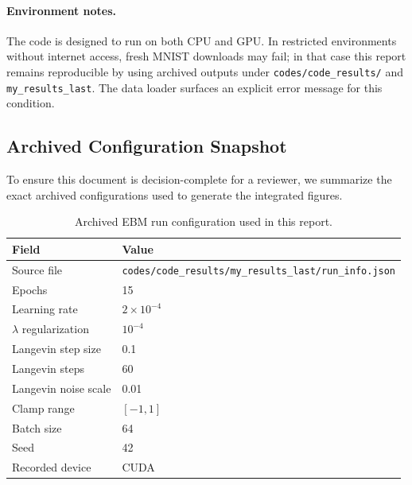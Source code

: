 \paragraph{Environment notes.}
The code is designed to run on both CPU and GPU. In restricted environments
without internet access, fresh MNIST downloads may fail; in that case this
report remains reproducible by using archived outputs under
\texttt{codes/code\_results/} and \texttt{my\_results\_last}. The data loader
surfaces an explicit error message for this condition.

\subsection{Archived Configuration Snapshot}

To ensure this document is decision-complete for a reviewer, we summarize the
exact archived configurations used to generate the integrated figures.

\begin{table}[H]
\centering
\caption{Archived EBM run configuration used in this report.}
\label{tab:ebm-archived-config}
\begin{tabular}{@{}ll@{}}
\toprule
\textbf{Field} & \textbf{Value} \\
\midrule
Source file & \texttt{codes/code\_results/my\_results\_last/run\_info.json} \\
Epochs & 15 \\
Learning rate & $2\times 10^{-4}$ \\
$\lambda$ regularization & $10^{-4}$ \\
Langevin step size & 0.1 \\
Langevin steps & 60 \\
Langevin noise scale & 0.01 \\
Clamp range & $[-1,1]$ \\
Batch size & 64 \\
Seed & 42 \\
Recorded device & CUDA \\
\bottomrule
\end{tabular}
\end{table}

